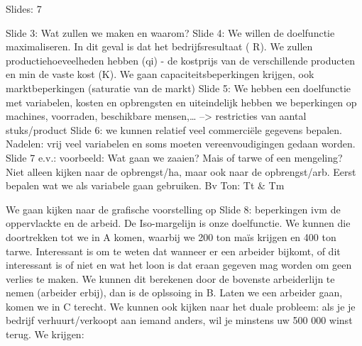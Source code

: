 \documentclass[10pt,a4paper]{report}
\begin{document}
 

Slides: 7

Slide 3: Wat zullen we maken en waarom?
Slide 4: We willen de doelfunctie maximaliseren. In dit geval is dat het bedrijfsresultaat ( R). We zullen productiehoeveelheden hebben (qi) - de kostprijs van de verschillende producten en min de vaste kost (K).
We gaan capaciteitsbeperkingen krijgen, ook marktbeperkingen (saturatie van de markt)
Slide 5: We hebben een doelfunctie met variabelen, kosten en opbrengsten en uiteindelijk hebben we beperkingen op machines, voorraden, beschikbare mensen,… --> restricties van aantal stuks/product
Slide 6: we kunnen relatief veel commerciële gegevens bepalen. Nadelen: vrij veel variabelen en soms moeten vereenvoudigingen gedaan worden.
Slide 7 e.v.: voorbeeld: Wat gaan we zaaien? Mais of tarwe of een mengeling? Niet alleen kijken naar de opbrengst/ha, maar ook naar de opbrengst/arb. Eerst bepalen wat we als variabele gaan gebruiken. Bv Ton: Tt $\&$ Tm
























We gaan kijken naar de grafische voorstelling op Slide 8: beperkingen ivm de oppervlackte en de arbeid. De Iso-margelijn is onze doelfunctie. We kunnen die doortrekken tot we in A komen, waarbij we 200 ton maïs krijgen en 400 ton tarwe. Interessant is om te weten dat wanneer er een arbeider bijkomt, of dit interessant is of niet en wat het loon is dat eraan gegeven mag worden om geen verlies te maken. We kunnen dit berekenen door de bovenste arbeiderlijn te nemen (arbeider erbij), dan is de oplssoing in B. Laten we een arbeider gaan, komen we in C terecht.
We kunnen ook kijken naar het duale probleem: als je je bedrijf verhuurt/verkoopt aan iemand anders, wil je minstens uw 500 000 winst terug. We krijgen:
\end{document}
